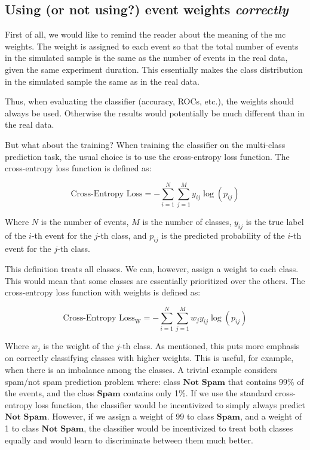 \subsection{Using (or not using?) event weights \em{correctly}}
\label{sec:weights}

First of all, we would like to remind the reader about the meaning of the \gls{mc} weights. The weight is assigned to
each event so that the total number of events in the simulated sample is the same as the number of events in the real
data, given the same experiment duration. This essentially makes the class distribution in the simulated sample the same
as in the real data.

Thus, when evaluating the classifier (accuracy, ROCs, etc.), the weights should always be used.
Otherwise the results would potentially be much different than in the real data.

But what about the training? When training the classifier on the multi-class prediction task, the usual choice is to use
the cross-entropy loss function. The cross-entropy loss function is defined as:

$$
    \text{Cross-Entropy Loss} = -\sum_{i=1}^{N} \sum_{j=1}^{M} y_{ij} \log(p_{ij})
$$

Where $N$ is the number of events, $M$ is the number of classes, $y_{ij}$ is the true label of the $i$-th event for the
$j$-th class, and $p_{ij}$ is the predicted probability of the $i$-th event for the $j$-th class.

This definition treats all classes. We can, however, assign a weight to each class. This would mean that some classes
are essentially prioritized over the others. The cross-entropy loss function with weights is defined as:

$$
    \text{Cross-Entropy Loss}_\text{W} = -\sum_{i=1}^{N} \sum_{j=1}^{M} w_j y_{ij} \log(p_{ij})
$$

Where $w_j$ is the weight of the $j$-th class. As mentioned, this puts more emphasis on correctly classifying classes
with higher weights. This is useful, for example, when there is an imbalance among the classes. A trivial example
considers spam/not spam prediction problem where: class $\textbf{Not Spam}$ that contains 99\% of the events, and the
class $\textbf{Spam}$ contains only 1\%. If we use the standard cross-entropy loss function, the classifier would be
incentivized to simply always predict $\textbf{Not Spam}$. However, if we assign a weight of 99 to class
$\textbf{Spam}$, and a weight of 1 to class $\textbf{Not Spam}$, the classifier would be incentivized to treat both
classes equally and would learn to discriminate between them much better.

